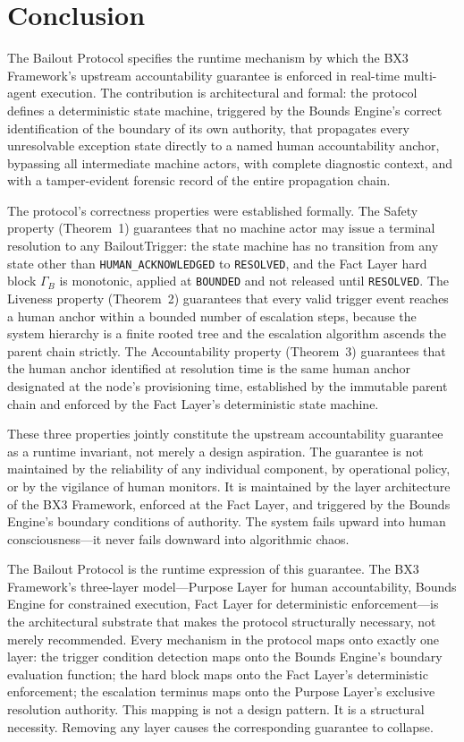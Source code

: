 \section{Conclusion}\label{sec:conclusion}

The Bailout Protocol specifies the runtime mechanism by which the BX3 Framework's upstream accountability guarantee is enforced in real-time multi-agent execution. The contribution is architectural and formal: the protocol defines a deterministic state machine, triggered by the Bounds Engine's correct identification of the boundary of its own authority, that propagates every unresolvable exception state directly to a named human accountability anchor, bypassing all intermediate machine actors, with complete diagnostic context, and with a tamper-evident forensic record of the entire propagation chain.

The protocol's correctness properties were established formally. The Safety property (Theorem~1) guarantees that no machine actor may issue a terminal resolution to any BailoutTrigger: the state machine has no transition from any state other than \texttt{HUMAN\_ACKNOWLEDGED} to \texttt{RESOLVED}, and the Fact Layer hard block $\Gamma_B$ is monotonic, applied at \texttt{BOUNDED} and not released until \texttt{RESOLVED}. The Liveness property (Theorem~2) guarantees that every valid trigger event reaches a human anchor within a bounded number of escalation steps, because the system hierarchy is a finite rooted tree and the escalation algorithm ascends the parent chain strictly. The Accountability property (Theorem~3) guarantees that the human anchor identified at resolution time is the same human anchor designated at the node's provisioning time, established by the immutable parent chain and enforced by the Fact Layer's deterministic state machine.

These three properties jointly constitute the upstream accountability guarantee as a runtime invariant, not merely a design aspiration. The guarantee is not maintained by the reliability of any individual component, by operational policy, or by the vigilance of human monitors. It is maintained by the layer architecture of the BX3 Framework, enforced at the Fact Layer, and triggered by the Bounds Engine's boundary conditions of authority. The system fails upward into human consciousness---it never fails downward into algorithmic chaos.

The Bailout Protocol is the runtime expression of this guarantee. The BX3 Framework's three-layer model---Purpose Layer for human accountability, Bounds Engine for constrained execution, Fact Layer for deterministic enforcement---is the architectural substrate that makes the protocol structurally necessary, not merely recommended. Every mechanism in the protocol maps onto exactly one layer: the trigger condition detection maps onto the Bounds Engine's boundary evaluation function; the hard block maps onto the Fact Layer's deterministic enforcement; the escalation terminus maps onto the Purpose Layer's exclusive resolution authority. This mapping is not a design pattern. It is a structural necessity. Removing any layer causes the corresponding guarantee to collapse.

